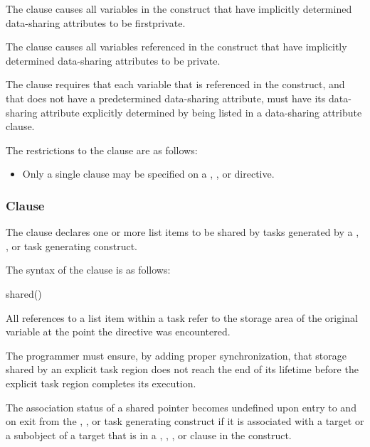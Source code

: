 {{{{\fortranspecificstart
The  clause causes all variables in the construct that have 
implicitly determined data-sharing attributes to be firstprivate.

The  clause causes all variables referenced in the construct that 
have implicitly determined data-sharing attributes to be private.
\fortranspecificend

The  clause requires that each variable that is referenced in the 
construct, and that does not have a predetermined data-sharing attribute, must have its 
data-sharing attribute explicitly determined by being listed in a data-sharing attribute 
clause. 

\restrictions
The restrictions to the  clause are as follows:

\begin{itemize}
\item Only a single  clause may be specified on a 
, ,  or  directive.
\end{itemize}









\subsubsection{ Clause}
\label{subsubsec:shared clause}
\summary
The  clause declares one or more list items to be shared by tasks generated by 
a , , or task generating construct.

\syntax
The syntax of the  clause is as follows:

\begin{boxedcode}
shared()
\end{boxedcode}

\descr
All references to a list item within a task refer to the storage area of the original variable 
at the point the directive was encountered. 

The programmer must ensure, by adding proper synchronization, that 
storage shared by an explicit task region does not reach the end of its lifetime before 
the explicit task region completes its execution. 


\fortranspecificstart
The association status of a shared pointer becomes undefined upon entry to and on exit 
from the , , or task generating construct if it
is associated with a target or a  subobject of a target that is in a ,
, , or  clause in the construct.


}}}}
